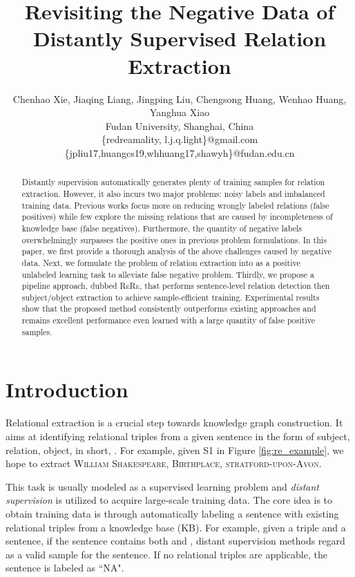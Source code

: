 \documentclass[11pt,a4paper]{article}
\title{Revisiting the Negative Data of Distantly Supervised Relation Extraction}
\author{Chenhao Xie, Jiaqing Liang, Jingping Liu, Chengsong Huang, Wenhao Huang, Yanghua Xiao\\
Fudan University, Shanghai, China\\
\{redreamality, l.j.q.light\}@gmail.com \quad \{jpliu17,huangcs19,whhuang17,shawyh\}@fudan.edu.cn
}
\date{}
\begin{document}
\maketitle
\begin{abstract}
Distantly supervision automatically generates plenty of training samples for relation extraction. 
However, it also incurs two major problems: noisy labels and imbalanced training data.
Previous works focus more on reducing wrongly labeled relations (false positives) while few explore the missing relations that are caused by incompleteness of knowledge base (false negatives).
Furthermore, the quantity of negative labels overwhelmingly surpasses the positive ones in previous problem formulations.
In this paper, we first provide a thorough analysis of the above challenges caused by negative data.
Next, we formulate the problem of relation extraction into as a positive unlabeled learning task to alleviate false negative problem. 
Thirdly, we propose a pipeline approach, dubbed \textsc{ReRe}, that performs sentence-level relation detection then subject/object extraction to achieve sample-efficient training.
Experimental results show that the proposed method consistently outperforms existing approaches and remains excellent performance even learned with a large quantity of false positive samples.
\end{abstract}


\section{Introduction}
Relational extraction is a crucial step towards knowledge graph construction.
It aims at identifying relational triples from a given sentence in the form of subject, relation, object, in short, .
For example, given S1 in Figure \ref{fig:re_example}, we hope to extract \textsc{William Shakespeare, Birthplace, stratford-upon-Avon}.




This task is usually modeled as a supervised learning problem and \textit{distant supervision} \cite{mintz2009distant} is utilized to acquire large-scale training data. 
The core idea is to obtain training data is through automatically labeling a sentence with existing relational triples from a knowledge base (KB). 
For example, given a triple  and a sentence, if the sentence contains both  and , distant supervision methods regard  as a valid sample for the sentence.
If no relational triples are applicable, the sentence is labeled as ``NA". 
\end{document}
